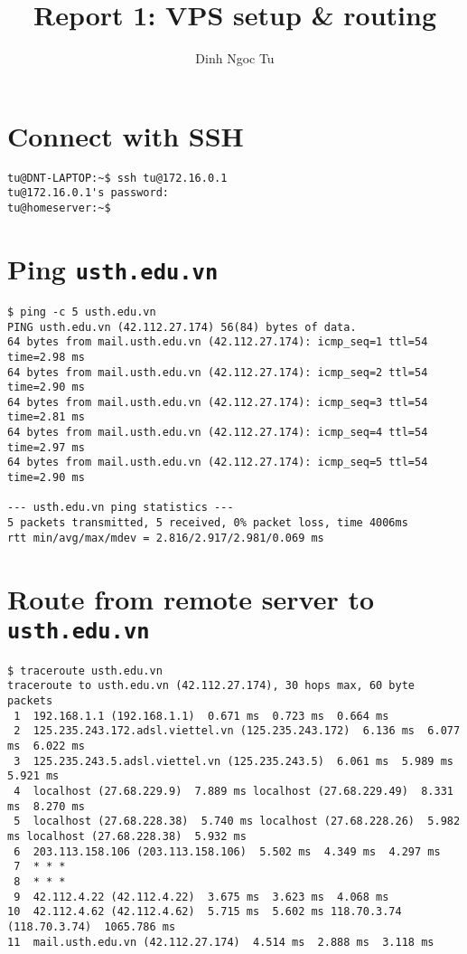 \documentclass[12pt]{article}
\title{Report 1: VPS setup \& routing}
\author{Dinh Ngoc Tu}
\begin{document}
\maketitle


\section{Connect with SSH}

\begin{lstlisting}[breaklines]
tu@DNT-LAPTOP:~$ ssh tu@172.16.0.1
tu@172.16.0.1's password:
tu@homeserver:~$
\end{lstlisting}


\section{Ping \texttt{usth.edu.vn}}

\begin{lstlisting}[breaklines]
$ ping -c 5 usth.edu.vn
PING usth.edu.vn (42.112.27.174) 56(84) bytes of data.
64 bytes from mail.usth.edu.vn (42.112.27.174): icmp_seq=1 ttl=54 time=2.98 ms
64 bytes from mail.usth.edu.vn (42.112.27.174): icmp_seq=2 ttl=54 time=2.90 ms
64 bytes from mail.usth.edu.vn (42.112.27.174): icmp_seq=3 ttl=54 time=2.81 ms
64 bytes from mail.usth.edu.vn (42.112.27.174): icmp_seq=4 ttl=54 time=2.97 ms
64 bytes from mail.usth.edu.vn (42.112.27.174): icmp_seq=5 ttl=54 time=2.90 ms

--- usth.edu.vn ping statistics ---
5 packets transmitted, 5 received, 0% packet loss, time 4006ms
rtt min/avg/max/mdev = 2.816/2.917/2.981/0.069 ms
\end{lstlisting}


\section{Route from remote server to \texttt{usth.edu.vn}}

\begin{lstlisting}[breaklines]
$ traceroute usth.edu.vn
traceroute to usth.edu.vn (42.112.27.174), 30 hops max, 60 byte packets
 1  192.168.1.1 (192.168.1.1)  0.671 ms  0.723 ms  0.664 ms
 2  125.235.243.172.adsl.viettel.vn (125.235.243.172)  6.136 ms  6.077 ms  6.022 ms
 3  125.235.243.5.adsl.viettel.vn (125.235.243.5)  6.061 ms  5.989 ms  5.921 ms
 4  localhost (27.68.229.9)  7.889 ms localhost (27.68.229.49)  8.331 ms  8.270 ms
 5  localhost (27.68.228.38)  5.740 ms localhost (27.68.228.26)  5.982 ms localhost (27.68.228.38)  5.932 ms
 6  203.113.158.106 (203.113.158.106)  5.502 ms  4.349 ms  4.297 ms
 7  * * *
 8  * * *
 9  42.112.4.22 (42.112.4.22)  3.675 ms  3.623 ms  4.068 ms
10  42.112.4.62 (42.112.4.62)  5.715 ms  5.602 ms 118.70.3.74 (118.70.3.74)  1065.786 ms
11  mail.usth.edu.vn (42.112.27.174)  4.514 ms  2.888 ms  3.118 ms
\end{lstlisting}
\end{document}
